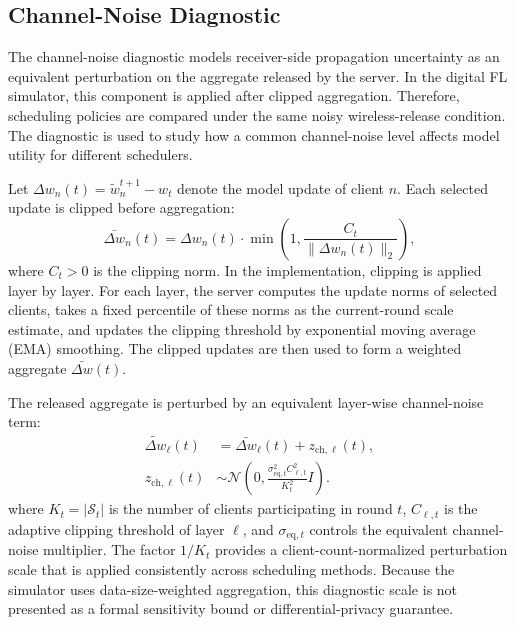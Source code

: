 \documentclass[journal]{IEEEtran}
\begin{document}
\subsection{Channel-Noise Diagnostic}

The channel-noise diagnostic models receiver-side propagation uncertainty as an equivalent perturbation on the aggregate released by the server. In the digital FL simulator, this component is applied after clipped aggregation. Therefore, scheduling policies are compared under the same noisy wireless-release condition. The diagnostic is used to study how a common channel-noise level affects model utility for different schedulers.

Let $\Delta w_n(t)=\tilde{w}_n^{t+1}-w_t$ denote the model update of client $n$. Each selected update is clipped before aggregation:
\begin{equation}
\bar{\Delta w}_n(t)=\Delta w_n(t)\cdot
\min\left(1,\frac{C_t}{\|\Delta w_n(t)\|_2}\right),
\end{equation}
where $C_t>0$ is the clipping norm. In the implementation, clipping is applied layer by layer. For each layer, the server computes the update norms of selected clients, takes a fixed percentile of these norms as the current-round scale estimate, and updates the clipping threshold by exponential moving average (EMA) smoothing. The clipped updates are then used to form a weighted aggregate $\bar{\Delta w}(t)$.

The released aggregate is perturbed by an equivalent layer-wise channel-noise term:
\begin{equation}
\label{eq:ch_noise}
\begin{aligned}
\tilde{\Delta w}_{\ell}(t)
&=\bar{\Delta w}_{\ell}(t)+z_{\mathrm{ch},\ell}(t),\\
z_{\mathrm{ch},\ell}(t)
&\sim \mathcal{N}\!\left(
0,\frac{\sigma_{\mathrm{eq},t}^2C_{\ell,t}^2}{K_t^2}I\right).
\end{aligned}
\end{equation}
where $K_t=|\mathcal{S}_t|$ is the number of clients participating in round $t$, $C_{\ell,t}$ is the adaptive clipping threshold of layer $\ell$, and $\sigma_{\mathrm{eq},t}$ controls the equivalent channel-noise multiplier. The factor $1/K_t$ provides a client-count-normalized perturbation scale that is applied consistently across scheduling methods. Because the simulator uses data-size-weighted aggregation, this diagnostic scale is not presented as a formal sensitivity bound or differential-privacy guarantee.
\end{document}
